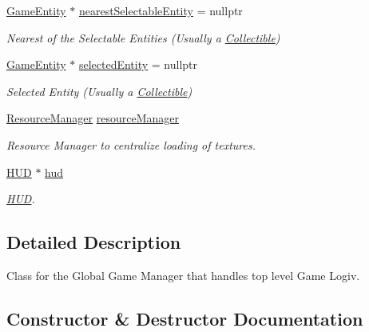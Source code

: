 \begin{DoxyCompactItemize}
\mbox{\hyperlink{class_game_entity}{Game\+Entity}} $\ast$ \mbox{\hyperlink{class_game_manager_a26c2f3a28d8dd798dcffc9a75db7450a}{nearest\+Selectable\+Entity}} = nullptr
\begin{DoxyCompactList}\small\item\em Nearest of the Selectable Entities (Usually a \mbox{\hyperlink{class_collectible}{Collectible}}) \end{DoxyCompactList}\item 
\mbox{\label{class_game_manager_a61a0d7583ac43785f6c1d22132bb62a4}} 
\mbox{\hyperlink{class_game_entity}{Game\+Entity}} $\ast$ \mbox{\hyperlink{class_game_manager_a61a0d7583ac43785f6c1d22132bb62a4}{selected\+Entity}} = nullptr
\begin{DoxyCompactList}\small\item\em Selected Entity (Usually a \mbox{\hyperlink{class_collectible}{Collectible}}) \end{DoxyCompactList}\item 
\mbox{\label{class_game_manager_a54f5c6345ec4315222235f34d4a1371e}} 
\mbox{\hyperlink{class_resource_manager}{Resource\+Manager}} \mbox{\hyperlink{class_game_manager_a54f5c6345ec4315222235f34d4a1371e}{resource\+Manager}}
\begin{DoxyCompactList}\small\item\em Resource Manager to centralize loading of textures. \end{DoxyCompactList}\item 
\mbox{\label{class_game_manager_a705cb1672de49f177bdac7b101986d01}} 
\mbox{\hyperlink{class_h_u_d}{H\+UD}} $\ast$ \mbox{\hyperlink{class_game_manager_a705cb1672de49f177bdac7b101986d01}{hud}}
\begin{DoxyCompactList}\small\item\em \mbox{\hyperlink{class_h_u_d}{H\+UD}}. \end{DoxyCompactList}\end{DoxyCompactItemize}


\subsection{Detailed Description}
Class for the Global Game Manager that handles top level Game Logiv. 

\subsection{Constructor \& Destructor Documentation}
\mbox{\label{class_game_manager_a6e574e4af055f58460f9ed807755089d}} 

